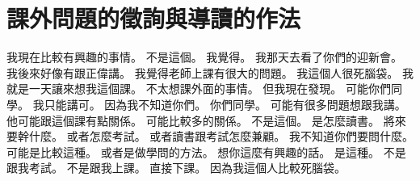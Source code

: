 \section{課外問題的徵詢與導讀的作法}

\hypertarget{w01:cue:2626}{}我現在比較有興趣的事情。
\hypertarget{w01:cue:2627}{}不是這個。
\hypertarget{w01:cue:2628}{}我覺得。
\hypertarget{w01:cue:2629}{}我那天去看了你們的迎新會。
\hypertarget{w01:cue:2630}{}我後來好像有跟正偉講。
\hypertarget{w01:cue:2631}{}我覺得老師上課有很大的問題。
\hypertarget{w01:cue:2632}{}我這個人很死腦袋。
\hypertarget{w01:cue:2633}{}我就是一天讓來想我這個課。
\hypertarget{w01:cue:2634}{}不太想課外面的事情。
\hypertarget{w01:cue:2635}{}但我現在發現。
\hypertarget{w01:cue:2636}{}可能你們同學。
\hypertarget{w01:cue:2637}{}我只能講可。
\hypertarget{w01:cue:2638}{}因為我不知道你們。
\hypertarget{w01:cue:2639}{}你們同學。
\hypertarget{w01:cue:2640}{}可能有很多問題想跟我講。
\hypertarget{w01:cue:2641}{}他可能跟這個課有點關係。
\hypertarget{w01:cue:2642}{}可能比較多的關係。
\hypertarget{w01:cue:2643}{}不是這個。
\hypertarget{w01:cue:2644}{}是怎麼讀書。
\hypertarget{w01:cue:2645}{}將來要幹什麼。
\hypertarget{w01:cue:2646}{}或者怎麼考試。
\hypertarget{w01:cue:2647}{}或者讀書跟考試怎麼兼顧。
\hypertarget{w01:cue:2648}{}我不知道你們要問什麼。
\hypertarget{w01:cue:2649}{}可能是比較這種。
\hypertarget{w01:cue:2650}{}或者是做學問的方法。
\hypertarget{w01:cue:2651}{}想你這麼有興趣的話。
\hypertarget{w01:cue:2652}{}是這種。
\hypertarget{w01:cue:2653}{}不是跟我考試。
\hypertarget{w01:cue:2654}{}不是跟我上課。
\hypertarget{w01:cue:2655}{}直接下課。
\hypertarget{w01:cue:2656}{}因為我這個人比較死腦袋。
